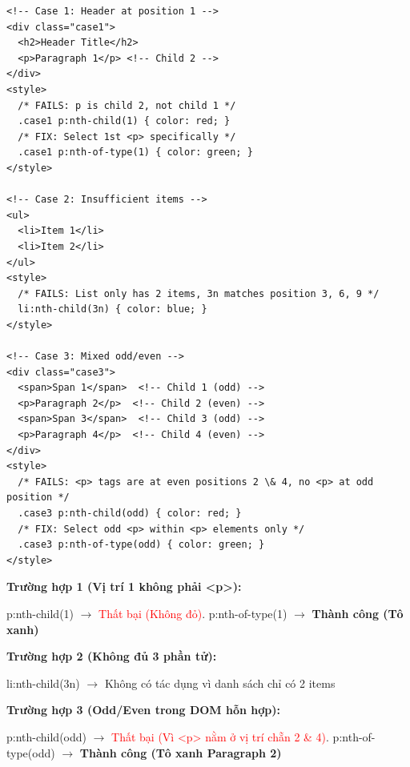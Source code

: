\begin{codeWindow}
\begin{lstlisting}[language=HTML5]
<!-- Case 1: Header at position 1 -->
<div class="case1">
  <h2>Header Title</h2>
  <p>Paragraph 1</p> <!-- Child 2 -->
</div>
<style>
  /* FAILS: p is child 2, not child 1 */
  .case1 p:nth-child(1) { color: red; }
  /* FIX: Select 1st <p> specifically */
  .case1 p:nth-of-type(1) { color: green; }
</style>

<!-- Case 2: Insufficient items -->
<ul>
  <li>Item 1</li>
  <li>Item 2</li>
</ul>
<style>
  /* FAILS: List only has 2 items, 3n matches position 3, 6, 9 */
  li:nth-child(3n) { color: blue; }
</style>

<!-- Case 3: Mixed odd/even -->
<div class="case3">
  <span>Span 1</span>  <!-- Child 1 (odd) -->
  <p>Paragraph 2</p>  <!-- Child 2 (even) -->
  <span>Span 3</span>  <!-- Child 3 (odd) -->
  <p>Paragraph 4</p>  <!-- Child 4 (even) -->
</div>
<style>
  /* FAILS: <p> tags are at even positions 2 \& 4, no <p> at odd position */
  .case3 p:nth-child(odd) { color: red; }
  /* FIX: Select odd <p> within <p> elements only */
  .case3 p:nth-of-type(odd) { color: green; }
</style>
\end{lstlisting}
\end{codeWindow}

\begin{browserWindow}
\sffamily\small
\textbf{Trường hợp 1 (Vị trí 1 không phải <p>):} \par\vspace{1pt}
\hspace{0.5em}p:nth-child(1) $\rightarrow$ \textcolor{red}{Thất bại (Không đỏ)}. p:nth-of-type(1) $\rightarrow$ \textcolor{green!70!black}{\textbf{Thành công (Tô xanh)}} \par\vspace{5pt}

\textbf{Trường hợp 2 (Không đủ 3 phần tử):} \par\vspace{1pt}
\hspace{0.5em}li:nth-child(3n) $\rightarrow$ \textcolor{gray!60}{Không có tác dụng vì danh sách chỉ có 2 items} \par\vspace{5pt}

\textbf{Trường hợp 3 (Odd/Even trong DOM hỗn hợp):} \par\vspace{1pt}
\hspace{0.5em}p:nth-child(odd) $\rightarrow$ \textcolor{red}{Thất bại (Vì <p> nằm ở vị trí chẵn 2 \& 4)}. p:nth-of-type(odd) $\rightarrow$ \textcolor{green!70!black}{\textbf{Thành công (Tô xanh Paragraph 2)}}
\end{browserWindow}

